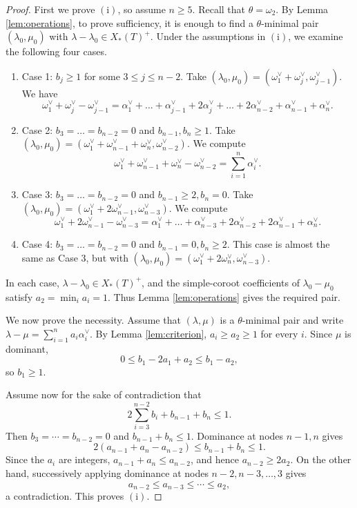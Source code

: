 \documentclass[a4paper, 12pt]{amsart}
\theoremstyle{definition}
\begin{document}
\begin{proof}
First we prove $(\mathrm{i})$, so assume $n \geq 5$. Recall that $\theta = \omega_2$. By Lemma \ref{lem:operations}, to prove sufficiency, it is enough to find a $\theta$-minimal pair $(\lambda_0, \mu_0)$ with $\lambda- \lambda_0 \in X_*(T)^+$. Under the assumptions in $(\mathrm{i})$, we examine the following four cases.

\begin{enumerate}
\item Case 1: $b_j \geq 1$ for some $3 \leq j \leq n-2$. Take $(\lambda_0,\mu_0)=(\omega_1^\vee+\omega_{j}^\vee, \omega_{j-1}^\vee)$. We have
\[
\omega_1^\vee+\omega_j^\vee-\omega_{j-1}^\vee=\alpha_1^\vee + \dots +\alpha_{j-1}^\vee+2\alpha_j^\vee +\dots +2 \alpha_{n-2}^\vee+\alpha_{n-1}^\vee+\alpha_n^\vee.
\]
\item Case 2: $b_3= \dots =b_{n-2}=0$ and $b_{n-1}, b_{n} \geq 1$. Take $(\lambda_0,\mu_0)=(\omega_1^\vee + \omega_{n-1}^\vee+\omega_n^\vee, \omega_{n-2}^\vee)$. We compute
\[
\omega_1^\vee+\omega_{n-1}^\vee+\omega_{n}^\vee-\omega_{n-2}^\vee= \sum_{i=1}^{n} \alpha_i^\vee.
\]
\item Case 3: $b_3 = \dots =b_{n-2}=0$ and $b_{n-1} \geq 2, b_{n}=0$. Take $(\lambda_0,\mu_0)=(\omega_1^\vee+2 \omega_{n-1}^\vee, \omega_{n-3}^\vee)$. We compute
\[
\omega_1^\vee+2\omega_{n-1}^\vee- \omega_{n-3}^\vee=\alpha_1^\vee + \dots +\alpha_{n-3}^\vee+2 \alpha_{n-2}^\vee+2\alpha_{n-1}^\vee+\alpha_n^\vee.
\]
\item Case 4: $b_3= \dots =b_{n-2}=0$ and $b_{n-1}=0, b_n \geq 2$. This case is almost the same as Case 3, but with $(\lambda_0, \mu_0)= (\omega_1^\vee+2 \omega_n^\vee, \omega_{n-3}^\vee)$.
\end{enumerate}
In each case, $\lambda-\lambda_0\in X_*(T)^+$, and the simple-coroot coefficients of $\lambda_0-\mu_0$ satisfy $a_2=\min_i a_i=1$. Thus Lemma \ref{lem:operations} gives the required pair.

We now prove the necessity. Assume that $(\lambda,\mu)$ is a $\theta$-minimal pair and write $\lambda-\mu=\sum_{i=1}^{n}a_i\alpha_i^\vee$. By Lemma \ref{lem:criterion}, $a_i\ge a_2\ge1$ for every $i$. Since $\mu$ is dominant,
\[
0\le b_1-2a_1+a_2\le b_1-a_2,
\]
so $b_1\ge1$.

Assume now for the sake of contradiction that
\[
2\sum_{i=3}^{n-2}b_i+b_{n-1}+b_n\le1.
\]
Then $b_3=\cdots=b_{n-2}=0$ and $b_{n-1}+b_n\le1$. Dominance at nodes $n-1,n$ gives
\[
2(a_{n-1}+a_n-a_{n-2})\le b_{n-1}+b_n\le1.
\]
Since the $a_i$ are integers, $a_{n-1}+a_n\le a_{n-2}$, and hence $a_{n-2}\ge2a_2$. On the other hand, successively applying dominance at nodes $n-2,n-3,\ldots,3$ gives
\[
a_{n-2}\le a_{n-3}\le\cdots\le a_2,
\]
a contradiction. This proves $(\mathrm{i})$.


\end{proof}
\end{document}
